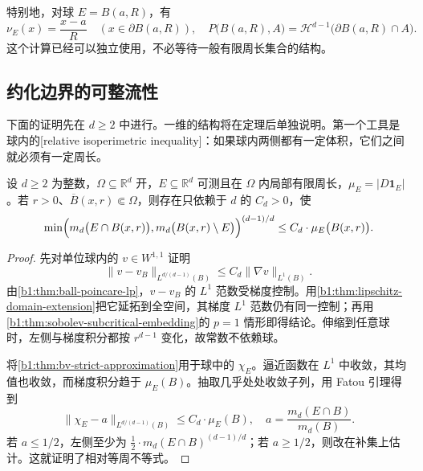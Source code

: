 \ProseParagraphBreak

特别地，对球 \(E=B(a,R)\)，有
\[
 \nu_E(x)=\frac{x-a}{R}\quad(x\in\partial B(a,R)),\quad
 P\bigl(B(a,R),A\bigr)=\mathcal H^{d-1}\bigl(\partial B(a,R)\cap A\bigr).
\]
这个计算已经可以独立使用，不必等待一般有限周长集合的结构。

\subsection{约化边界的可整流性}
\label{b1:subsec:270502}

下面的证明先在 \(d\ge2\) 中进行。一维的结构将在定理后单独说明。第一个工具是球内的[relative isoperimetric inequality]：如果球内两侧都有一定体积，它们之间就必须有一定周长。

\begin{lemma}[球内相对等周不等式]\label{b1:lem:relative-isoperimetric-ball}
设 \(d\ge2\) 为整数，\(\Omega\subseteq\mathbb R^d\) 开，\(E\subseteq\mathbb R^d\) 可测且在 \(\Omega\) 内局部有限周长，\(\mu_E=|D\mathbf1_E|\)。若 \(r>0\)、\(\overline B(x,r)\Subset\Omega\)，则存在只依赖于 \(d\) 的 \(C_d>0\)，使
\begin{equation}\label{b1:eq:relative-isoperimetric-ball}
 \min\Bigl(m_d\bigl(E\cap B(x,r)\bigr),m_d\bigl(B(x,r)\setminus E\bigr)\Bigr)^{(d-1)/d}
 \le C_d\cdot \mu_E\bigl(B(x,r)\bigr).
\end{equation}
\end{lemma}
\begin{proof}
先对单位球内的 \(v\in W^{1,1}\) 证明
\[
 \|v-v_B\|_{L^{d/(d-1)}(B)}
 \le C_d\|\nabla v\|_{L^1(B)}.
\]
由\cref{b1:thm:ball-poincare-lp}，\(v-v_B\) 的 \(L^1\) 范数受梯度控制。用\cref{b1:thm:lipschitz-domain-extension}把它延拓到全空间，其梯度 \(L^1\) 范数仍有同一控制；再用\cref{b1:thm:sobolev-subcritical-embedding}的 \(p=1\) 情形即得结论。伸缩到任意球时，左侧与梯度积分都按 \(r^{d-1}\) 变化，故常数不依赖球。

将\cref{b1:thm:bv-strict-approximation}用于球中的 \(\chi_E\)。逼近函数在 \(L^1\) 中收敛，其均值也收敛，而梯度积分趋于 \(\mu_E(B)\)。抽取几乎处处收敛子列，用 Fatou 引理得到
\[
 \|\chi_E-a\|_{L^{d/(d-1)}(B)}
 \le C_d\cdot \mu_E(B),\quad a=\frac{m_d(E\cap B)}{m_d(B)}.
\]
若 \(a\le1/2\)，左侧至少为
\(\tfrac12\cdot m_d(E\cap B)^{(d-1)/d}\)；若 \(a\ge1/2\)，则改在补集上估计。这就证明了相对等周不等式。
\end{proof}

